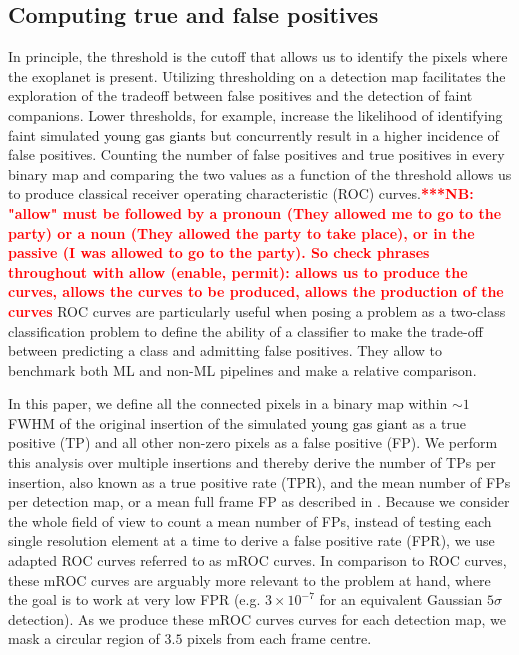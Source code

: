 \documentclass{aa}
\newcommand{\newchange}[1]{\textcolor{black}{#1}}
\begin{document}
\subsection{Computing true and false positives}
\label{sec:TPFP}


In principle, the threshold is the cutoff that allows us to identify the pixels where the exoplanet is present.
Utilizing thresholding on a detection map facilitates the exploration of the tradeoff between false positives and the detection of faint companions. Lower thresholds, for example, increase the likelihood of identifying faint simulated \newchange{young gas giant}s but concurrently result in a higher incidence of false positives.
Counting the number of false positives and true positives in every binary map and comparing the two values as a function of the threshold allows us to produce classical receiver operating characteristic (ROC) curves.\textcolor{red}{\textbf{***NB: "allow" must be followed by a pronoun (They allowed me to go to the party) or a noun (They allowed the party to take place), or in the passive (I was allowed to go to the party). So check phrases throughout with allow (enable, permit): allows us to produce the curves, allows the curves to be produced, allows the production of the curves   } }
ROC curves are particularly useful when posing a problem as a two-class classification problem to define the ability of a classifier to make the trade-off between predicting a class and admitting false positives.
They allow to benchmark both ML and non-ML pipelines and make a relative comparison. 

In this paper, we define all the connected pixels in a binary map within $\sim 1$ FWHM of the original insertion of the simulated \newchange{young gas giant} as a true positive (TP) and all other non-zero pixels as a false positive (FP). We perform this analysis over multiple insertions and thereby derive the number of TPs per insertion, also known as a true positive rate (TPR), and the mean number of FPs per detection map, or a mean full frame FP as described in \citet{2018Gomez}. Because we consider the whole field of view to count a mean number of FPs, instead of testing each single resolution element at a time to derive a false positive rate (FPR), we use adapted ROC curves referred to as mROC curves. In comparison to ROC curves, these mROC curves are arguably more relevant to the problem at hand, where the goal is to work at very low FPR (e.g. $3\times 10^{-7}$ for an equivalent Gaussian $5\sigma$ detection). As we produce these mROC curves  curves for each detection map, we mask a circular region of $3.5$ pixels from each frame centre.
\end{document}
